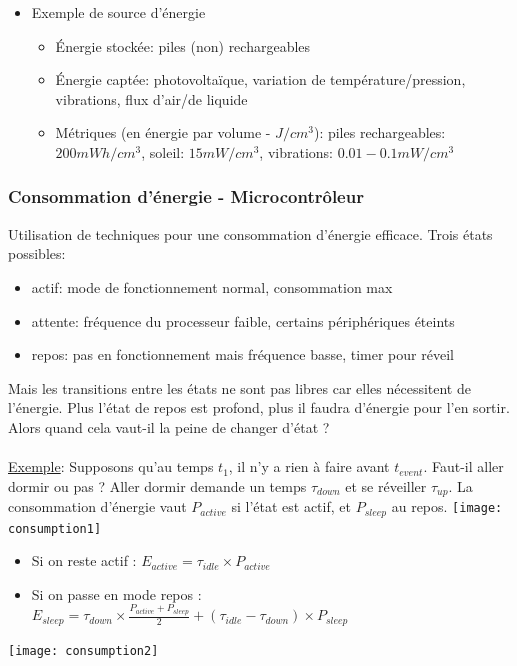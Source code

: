 \documentclass{article}
\begin{document}
\begin{sffamily}
\begin{itemize}
\item Exemple de source d'énergie
  \begin{itemize}
  \item Énergie stockée: piles (non) rechargeables
  \item Énergie captée:
    photovoltaïque, variation de température/pression, vibrations,
    flux d'air/de liquide
  \item Métriques (en énergie par volume - $J/cm^3$):
    piles rechargeables: $200mWh/cm^3$,
    soleil: $15mW/cm^3$,
    vibrations: $0.01-0.1 mW/cm^3$
  \end{itemize}
\end{itemize}

\subsubsection{Consommation d'énergie - Microcontrôleur}
Utilisation de techniques pour une consommation d'énergie efficace.
Trois états possibles:
\begin{itemize}
\item actif: mode de fonctionnement normal, consommation max
\item attente: fréquence du processeur faible, certains périphériques éteints
\item repos: pas en fonctionnement mais fréquence basse, timer pour réveil
\end{itemize}
Mais les transitions entre les états ne sont pas libres car elles nécessitent
de l'énergie. Plus l'état de repos est profond, plus il faudra d'énergie pour
l'en sortir. Alors quand cela vaut-il la peine de changer d'état ?
\\\\
\underline{Exemple}:
Supposons qu'au temps $t_1$, il n'y a rien à faire avant $t_{event}$.
Faut-il aller dormir ou pas ?
Aller dormir demande un temps $\tau_{down}$ et se réveiller $\tau_{up}$.
La consommation d'énergie vaut $P_{active}$ si l'état est actif, et
$P_{sleep}$ au repos.
\texttt{[image: consumption1]}

\begin{itemize}
\item Si on reste actif : $E_{active} = \tau_{idle} \times P_{active}$
\item Si on passe en mode repos :
  $E_{sleep} = \tau_{down} \times \frac{P_{active} + P_{sleep}}{2} +
  (\tau_{idle}-\tau_{down}) \times P_{sleep}$
\end{itemize}
\texttt{[image: consumption2]}


\end{sffamily}
\end{document}
